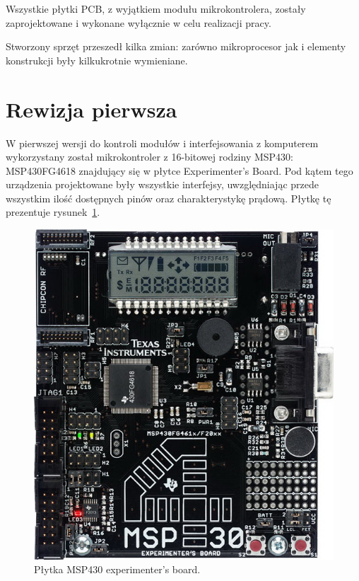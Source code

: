 Wszystkie płytki PCB, z wyjątkiem modułu mikrokontrolera, zostały zaprojektowane i wykonane wyłącznie w celu realizacji pracy.

Stworzony sprzęt przeszedł kilka zmian: zarówno mikroprocesor jak i elementy konstrukcji były kilkukrotnie wymieniane.\\

\section{Rewizja pierwsza}

W pierwszej wersji do kontroli modułów i interfejsowania z komputerem wykorzystany został mikrokontroler z 16-bitowej rodziny MSP430: MSP430FG4618 znajdujący się w płytce Experimenter's Board.
Pod kątem tego urządzenia projektowane były wszystkie interfejsy, uwzględniając przede wszystkim ilość dostępnych pinów oraz charakterystykę prądową.
Płytkę tę prezentuje rysunek~\ref{fig:msp430_exp}.

\begin{figure}
 \includegraphics[width=\textwidth]{gfx/exp43000}
 \caption{Płytka MSP430 experimenter's board.}
 \label{fig:msp430_exp}
\end{figure}

